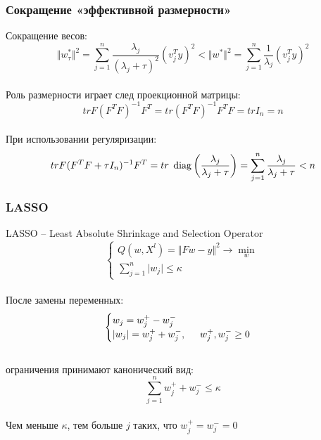 \documentclass[12pt]{beamer}
\begin{document}
\begin{frame}\frametitle{Сокращение «эффективной размерности»}
Сокращение весов:\\
$$\Vert w_{\tau}^* \Vert^2 = \sum\limits_{j=1}^n \frac{\lambda_j}{(\lambda_j + \tau)^2} (v^T_j y)^2 < \Vert w^* \Vert^2  = \sum\limits_{j=1}^n \frac{1}{\lambda_j} (v_j^Ty)^2$$\\
Роль размерности играет след проекционной матрицы:\\
$$tr F(F^TF)^{-1}F^T = tr(F^TF)^{-1}F^TF = tr I_n = n$$\\
При использовании регуляризации:\\
$$tr F(F^TF + \tau I_n)^{-1}F^T = tr \hspace{1mm}  \operatorname{diag} \left(\frac{\lambda_j}{\lambda_j + \tau}\right)= \sum\limits_{j=1}^n \frac{\lambda_j}{\lambda_j + \tau } < n $$
\end{frame}

\begin{frame}\frametitle{LASSO}
LASSO -- Least Absolute Shrinkage and Selection Operator\\
$$
\begin{cases} Q(w,X^l) = \Vert Fw - y \Vert^2 \rightarrow \min\limits_{w} \\
\sum_{j=1}^n \vert w_j \vert \leq \kappa
\end{cases}
$$\\
После замены переменных:\\
$$
\begin{cases} w_j = w_j^+ - w_j^-\\
\vert w_j \vert = w_j^+ + w_j^-, \hspace{5mm} w_j^+, w_j^- \geq 0\\

\end{cases}
$$\\
ограничения принимают канонический вид:\\
$$\sum\limits_{j=1}^n w_j^+ + w_j^- \leq \kappa$$\\
Чем меньше $\kappa$, тем больше $j$ таких, что $w_j^+ = w_j^- = 0$\\
\end{frame}
\end{document}
